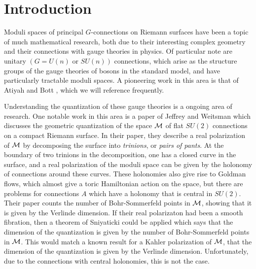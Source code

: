 \section{Introduction}
\label{s:intro}

	Moduli spaces of principal $G$-connections on Riemann surfaces have been a topic of much mathematical research, both due to their interesting complex geometry and their connections with gauge theories in physics. Of particular note are unitary $(G=U(n) \text{ or }SU(n))$ connections, which arise as the structure groups of the gauge theories of bosons in the standard model, and have particularly tractable moduli spaces. A pioneering work in this area is that of Atiyah and Bott \cite{atiyah_yang-mills_1983}, which we will reference frequently. 
	
	Understanding the quantization of these gauge theories is a ongoing area of research. One notable work in this area is a paper of Jeffrey and Weitsman \cite{jeffrey_bohr-sommerfeld_1992} which discusses the geometric quantization of the space $\mathcal{M}$ of flat $SU(2)$ connections on a compact Riemann surface. In their paper, they describe a real polarization of $\mathcal{M}$ by decomposing the surface into \textit{trinions}, or \textit{pairs of pants}. At the boundary of two trinions in the decomposition, one has a closed curve in the surface, and a real polarization of the moduli space can be given by the holonomy of connections around these curves. These holonomies also give rise to Goldman flows, which almost give a toric Hamiltonian action on the space, but there are problems for connections $A$ which have a holonomy that is central in $SU(2)$. Their paper counts the number of Bohr-Sommerfeld points in $\mathcal{M}$, showing that it is given by the Verlinde dimension. If their real polarizaton had been a smooth fibration, then a theorem of Sniyaticki could be applied which says that the dimension of the quantization is given by the number of Bohr-Sommerfeld points in $\mathcal{M}$. This would match a known result for a Kahler polarization of $\mathcal{M}$, that the dimension of the quantization is given by the Verlinde dimension. Unfortunately, due to the connections with central holonomies, this is not the case.
	
